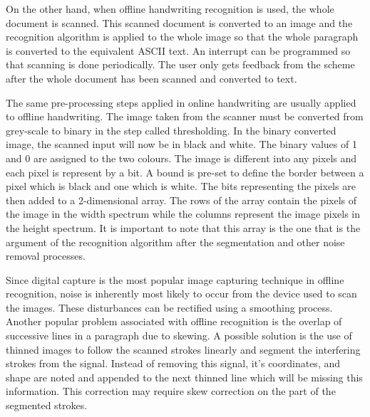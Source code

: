 On the other hand, when offline handwriting recognition is used, the whole document is scanned. This scanned document is converted to an image and the recognition algorithm is applied to the whole image so that the whole paragraph is converted to the equivalent ASCII text. An interrupt can be programmed so that scanning is done periodically. The user only gets feedback from the scheme after the whole document has been scanned and converted to text.

The same pre-processing steps applied in online handwriting are usually applied to offline handwriting. The image taken from the scanner must be converted from grey-scale to binary in the step called thresholding. In the binary converted image, the scanned input will now be in black and white. The binary values of 1 and 0 are assigned to the two colours. The image is different into any pixels and each pixel is represent by a bit. A bound is pre-set to define the border between a pixel which is black and one which is white. The bits representing the pixels are then added to a 2-dimensional array. The rows of the array contain the pixels of the image in the width spectrum while the columns represent the image pixels in the height spectrum. It is important to note that this array is the one that is the argument of the recognition algorithm after the segmentation and other noise removal processes. 

Since digital capture is the most popular image capturing technique in offline recognition, noise is inherently most likely to occur from the device used to scan the images. These disturbances can be rectified using a smoothing process. Another popular problem associated with offline recognition is the overlap of successive lines in a paragraph due to skewing. A possible solution is the use of thinned images to follow the scanned strokes linearly and segment the interfering strokes from the signal. Instead of removing this signal, it’s coordinates, and shape are noted and appended to the next thinned line which will be missing this information. This correction may require skew correction on the part of the segmented strokes. 

